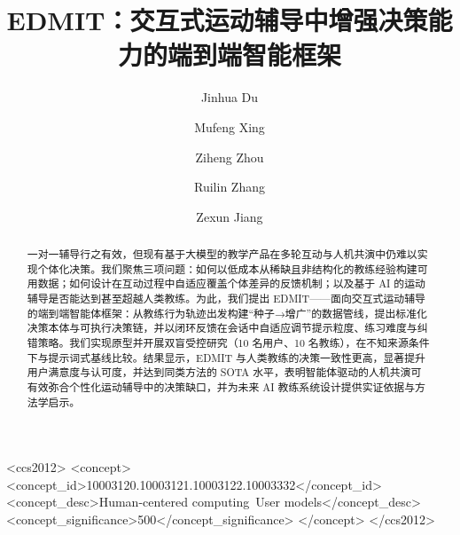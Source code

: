 \documentclass[sigconf]{acmart}
\begin{document}
\title{EDMIT：交互式运动辅导中增强决策能力的端到端智能框架}

\author{Jinhua Du}


\author{Mufeng Xing}
\author{Ziheng Zhou}
\author{Ruilin Zhang}

\author{Zexun Jiang}


\begin{abstract}
一对一辅导行之有效，但现有基于大模型的教学产品在多轮互动与人机共演中仍难以实现个体化决策。我们聚焦三项问题：如何以低成本从稀缺且非结构化的教练经验构建可用数据；如何设计在互动过程中自适应覆盖个体差异的反馈机制；以及基于 AI 的运动辅导是否能达到甚至超越人类教练。为此，我们提出 EDMIT——面向交互式运动辅导的端到端智能体框架：从教练行为轨迹出发构建“种子→增广”的数据管线，提出标准化决策本体与可执行决策链，并以闭环反馈在会话中自适应调节提示粒度、练习难度与纠错策略。我们实现原型并开展双盲受控研究（10 名用户、10 名教练），在不知来源条件下与提示词式基线比较。结果显示，EDMIT 与人类教练的决策一致性更高，显著提升用户满意度与认可度，并达到同类方法的 SOTA 水平，表明智能体驱动的人机共演可有效弥合个性化运动辅导中的决策缺口，并为未来 AI 教练系统设计提供实证依据与方法学启示。
\end{abstract}

\begin{CCSXML}
  <ccs2012>
  <concept>
  <concept_id>10003120.10003121.10003122.10003332</concept_id>
  <concept_desc>Human-centered computing~User models</concept_desc>
  <concept_significance>500</concept_significance>
  </concept>
  </ccs2012>
\end{CCSXML}
\end{document}
